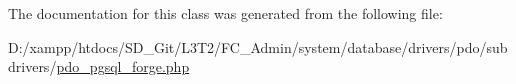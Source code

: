 The documentation for this class was generated from the following file\+:\begin{DoxyCompactItemize}
\item 
D\+:/xampp/htdocs/\+S\+D\+\_\+\+Git/\+L3\+T2/\+F\+C\+\_\+\+Admin/system/database/drivers/pdo/subdrivers/\hyperlink{pdo__pgsql__forge_8php}{pdo\+\_\+pgsql\+\_\+forge.\+php}\end{DoxyCompactItemize}
